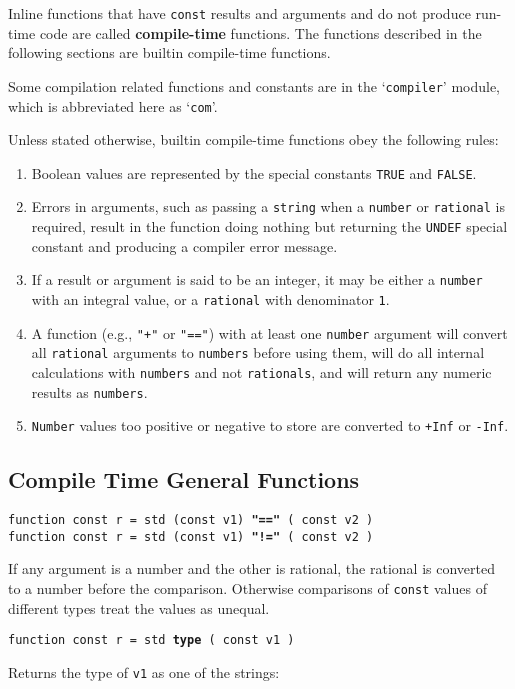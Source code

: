 \documentclass[12pt]{article}
\newcommand{\key}[1]{{\rm \bfseries #1}}
\newcommand{\ttkey}[1]{{\tt \bfseries #1}}
\newenvironment{indpar}[1][0.3in]%
	{\begin{list}{}%
		     {\setlength{\itemsep}{0in}%
		      \setlength{\topsep}{0in}%
		      \setlength{\parsep}{1ex}%
		      \setlength{\labelwidth}{#1}%
		      \setlength{\leftmargin}{#1}%
		      \addtolength{\leftmargin}{\labelsep}}%
	 \item}%
	{\end{list}}
\begin{document}
Inline functions that have {\tt const} results and arguments
and do not produce run-time code are called \key{compile-time}
functions.  The functions described in the
following sections are builtin compile-time functions.

Some compilation related functions and
constants are in the `{\tt compiler}' module,
which is abbreviated here as `{\tt com}'.

Unless stated otherwise, builtin compile-time functions
obey the following rules:
\begin{enumerate}
\item
Boolean values are represented by the special constants
{\tt TRUE} and {\tt FALSE}.
\item
Errors in arguments, such as passing a {\tt string} when a
{\tt number} or {\tt rational} is required, result in the
function doing nothing but returning
the {\tt UNDEF} special constant and producing
a compiler error message.
\item
If a result or argument is said to be an integer, it may
be either a {\tt number} with an integral value, or a
{\tt rational} with denominator {\tt 1}.
\item
A function (e.g., {\tt "+"} or {\tt "=="})
with at least one {\tt number} argument will
convert all {\tt rational} arguments to {\tt numbers}
before using them, will do all internal calculations with
{\tt numbers} and not {\tt rationals},
and will return any numeric results as {\tt numbers}.
\item
{\tt Number} values too positive or negative to store
are converted to {\tt +Inf} or {\tt -Inf}.
\end{enumerate}

\subsection{Compile Time General Functions}

{\tt function const r = std (const v1) \ttkey{"=="} ( const v2 )} \\
{\tt function const r = std (const v1) \ttkey{"!="} ( const v2 )}
\begin{indpar}
If any argument is a number and the other is rational,
the rational is converted to a number before the comparison.
Otherwise comparisons of {\tt const} values of different types treat
the values as unequal.
\end{indpar}

{\tt function const r = std \ttkey{type} ( const v1 )}
\begin{indpar}
Returns the type of {\tt v1} as one of the strings: \\
\hspace*{0.5in}{\tt
"special" ~  "number" ~ "rational" ~ "string" ~ \tt "map"}
\end{indpar}
\end{document}
